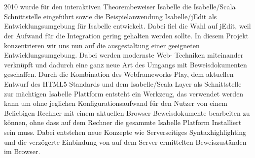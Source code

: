 \section*{\abstractname}

2010 wurde für den interaktiven Theorembeweiser Isabelle die Isabelle/Scala Schnittstelle eingeführt
sowie die Beispielanwendung Isabelle/jEdit als Entwicklungsumgebung für Isabelle entwickelt. Dabei
fiel die Wahl auf jEdit, weil der Aufwand für die Integration gering gehalten werden sollte. In
diesem Projekt konzentrieren wir uns nun auf die ausgestaltung einer geeigneten
Entwicklungsumgebung. Dabei werden modernste Web- Techniken miteinander verknüpft und dadurch eine
ganz neue Art des Umgangs mit Beweisdokumenten geschaffen. Durch die Kombination des Webframeworks
Play, dem aktuellen Entwurf des HTML5 Standards und dem Isabelle/Scala Layer als Schnittstelle zur
mächtigen Isabelle Plattform entsteht ein Werkzeug, das verwendet werden kann um ohne jeglichen
Konfigurationsaufwand für den Nutzer von einem Beliebigen Rechner mit einem aktuellen Browser
Beweisdokumente bearbeiten zu können, ohne dass auf dem Rechner die gesammte Isabelle Platform
Installiert sein muss. Dabei entstehen neue Konzepte wie Serverseitiges Syntaxhighlighting und die
verzögerte Einbindung von auf dem Server ermittelten Beweiszuständen im Browser.
